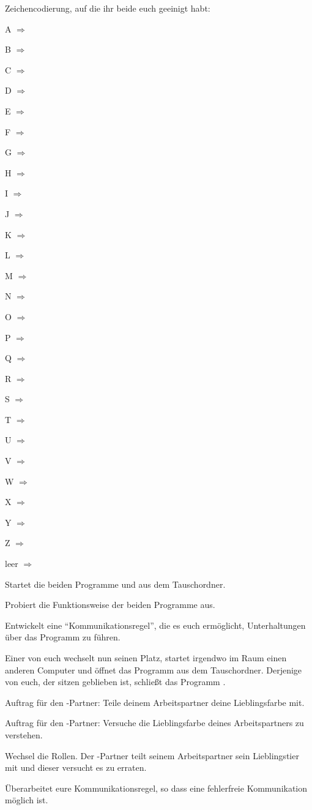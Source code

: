 \documentclass[10pt, a4paper]{scrartcl}
\newcommand{\letter}[2][1.5cm]{#2 $\Rightarrow$ \luecke{#1}}
\begin{document}
Zeichencodierung, auf die ihr beide euch geeinigt habt:
\begin{rahmen}
\begin{multicols}{5}
	\letter{A}

	\letter{B}

	\letter{C}

	\letter{D}

	\letter{E}

	\letter{F}

	\letter{G}

	\letter{H}

	\letter{I}

	\letter{J}

	\letter{K}

	\letter{L}

	\letter{M}

	\letter{N}

	\letter{O}

	\letter{P}

	\letter{Q}

	\letter{R}

	\letter{S}

	\letter{T}

	\letter{U}

	\letter{V}

	\letter{W}

	\letter{X}

	\letter{Y}

	\letter{Z}

	\letter[1.1cm]{leer}
\end{multicols}
\end{rahmen}

\begin{aufgabe}
	Startet die beiden Programme  und  aus dem Tauschordner.

	\begin{teilaufgaben}
		\teilaufgabe Probiert die Funktionsweise der beiden Programme aus.

		\teilaufgabe Entwickelt eine \enquote{Kommunikationsregel}, die es euch ermöglicht, Unterhaltungen über das Programm zu führen.
	\end{teilaufgaben}
\end{aufgabe}

\begin{aufgabe}
	Einer von euch wechselt nun seinen Platz, startet irgendwo im Raum einen anderen Computer und öffnet das Programm  aus dem Tauschordner. Derjenige von euch, der sitzen geblieben ist, schließt das Programm \programm{Gold City}.

	\begin{teilaufgaben}
		\teilaufgabe Auftrag für den -Partner: Teile deinem Arbeitspartner deine Lieblingsfarbe mit.

		Auftrag für den -Partner: Versuche die Lieblingsfarbe deines Arbeitspartners zu verstehen.

		\teilaufgabe Wechsel die Rollen. Der -Partner teilt seinem Arbeitspartner sein Lieblingstier mit und dieser versucht es zu erraten.
	\end{teilaufgaben}
\end{aufgabe}

\begin{aufgabe}
	Überarbeitet eure Kommunikationsregel, so dass eine fehlerfreie Kommunikation möglich ist.
\end{aufgabe}
\end{document}
